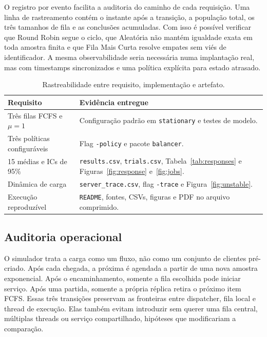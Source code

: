 \documentclass[conference]{IEEEtran}
\begin{document}
O registro por evento facilita a auditoria do caminho de cada requisição. Uma linha de rastreamento contém o instante após a transição, a população total, os três tamanhos de fila e as conclusões acumuladas. Com isso é possível verificar que Round Robin segue o ciclo, que Aleatória não mantém igualdade exata em toda amostra finita e que Fila Mais Curta resolve empates sem viés de identificador. A mesma observabilidade seria necessária numa implantação real, mas com timestamps sincronizados e uma política explícita para estado atrasado.

\begin{table}[!t]
\caption{Rastreabilidade entre requisito, implementação e artefato.}
\label{tab:coverage}
\centering
\scriptsize
\begin{tabular}{p{}p{}}
\toprule
Requisito & Evidência entregue \\
\midrule
Três filas FCFS e $\mu=1$ & Configuração padrão em \texttt{stationary} e testes de modelo. \\
Três políticas configuráveis & Flag \texttt{-policy} e pacote \texttt{balancer}. \\
15 médias e ICs de 95\% & \texttt{results.csv}, \texttt{trials.csv}, Tabela~\ref{tab:responses} e Figuras~\ref{fig:response} e~\ref{fig:jobs}. \\
Dinâmica de carga & \texttt{server\_trace.csv}, flag \texttt{-trace} e Figura~\ref{fig:unstable}. \\
Execução reproduzível & \texttt{README}, fontes, CSVs, figuras e PDF no arquivo comprimido. \\
\bottomrule
\end{tabular}
\end{table}

\subsection{Auditoria operacional}
O simulador trata a carga como um fluxo, não como um conjunto de clientes pré-criado. Após cada chegada, a próxima é agendada a partir de uma nova amostra exponencial. Após o encaminhamento, somente a fila escolhida pode iniciar serviço. Após uma partida, somente a própria réplica retira o próximo item FCFS. Essas três transições preservam as fronteiras entre dispatcher, fila local e thread de execução. Elas também evitam introduzir sem querer uma fila central, múltiplas threads ou serviço compartilhado, hipóteses que modificariam a comparação.
\end{document}
